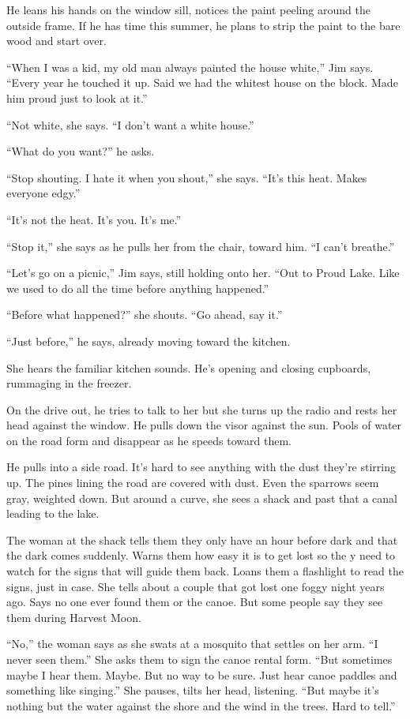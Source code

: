 \documentclass[twoside,10pt]{book}
\begin{document}
He leans his hands on the window sill, notices the paint peeling around
the outside frame. If he has time this summer, he plans to strip the
paint to the bare wood and start over.

``When I was a kid, my old man always painted the house white,'' Jim
says. ``Every year he touched it up. Said we had the whitest house on
the block. Made him proud just to look at it.''

``Not white, she says. ``I don't want a white house.''

``What do you want?'' he asks.

``Stop shouting. I hate it when you shout,'' she says. ``It's this heat.
Makes everyone edgy.''

``It's not the heat. It's you. It's me.''

``Stop it,'' she says as he pulls her from the chair, toward him. ``I
can't breathe.''

``Let's go on a picnic,'' Jim says, still holding onto her. ``Out to
Proud Lake. Like we used to do all the time before anything happened.''

``Before what happened?'' she shouts. ``Go ahead, say it.''

``Just before,'' he says, already moving toward the kitchen.

She hears the familiar kitchen sounds. He's opening and closing
cupboards, rummaging in the freezer.

On the drive out, he tries to talk to her but she turns up the radio and
rests her head against the window. He pulls down the visor against the
sun. Pools of water on the road form and disappear as he speeds toward
them.

He pulls into a side road. It's hard to see anything with the dust
they're stirring up. The pines lining the road are covered with dust.
Even the sparrows seem gray, weighted down. But around a curve, she sees
a shack and past that a canal leading to the lake.

The woman at the shack tells them they only have an hour before dark and
that the dark comes suddenly. Warns them how easy it is to get lost so
the y need to watch for the signs that will guide them back. Loans them
a flashlight to read the signs, just in case. She tells about a couple
that got lost one foggy night years ago. Says no one ever found them or
the canoe. But some people say they see them during Harvest Moon.

``No,'' the woman says as she swats at a mosquito that settles on her
arm. ``I never seen them.'' She asks them to sign the canoe rental form.
``But sometimes maybe I hear them. Maybe. But no way to be sure. Just
hear canoe paddles and something like singing.'' She pauses, tilts her
head, listening. ``But maybe it's nothing but the water against the
shore and the wind in the trees. Hard to tell.''
\end{document}
